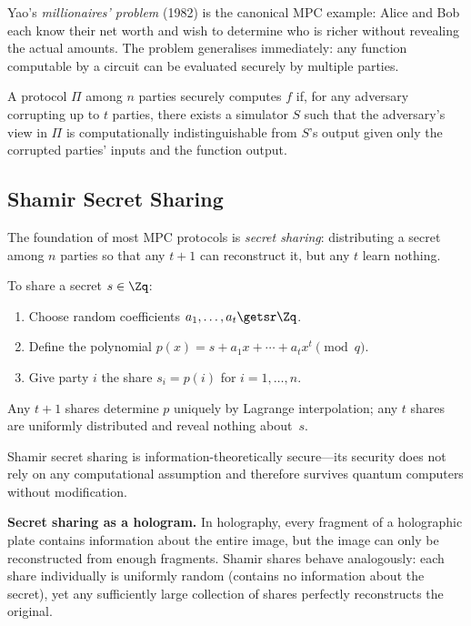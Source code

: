 Yao's \emph{millionaires' problem} (1982) is the canonical MPC example: Alice and Bob each know their net worth and wish to determine who is richer without revealing the actual amounts.  The problem generalises immediately: any function computable by a circuit can be evaluated securely by multiple parties.

\begin{definition}
\label{def:mpc}
A protocol $\Pi$ among $n$ parties securely computes $f$ if, for any adversary corrupting up to $t$ parties, there exists a simulator $S$ such that the adversary's view in $\Pi$ is computationally indistinguishable from $S$'s output given only the corrupted parties' inputs and the function output.
\end{definition}


\subsection{Shamir Secret Sharing}
\label{subsec:shamir}

The foundation of most MPC protocols is \emph{secret sharing}: distributing a secret among $n$ parties so that any $t+1$ can reconstruct it, but any $t$ learn nothing.

\begin{definition}
\label{def:shamir}
To share a secret $s \in \Zq$:
\begin{enumerate}
\item Choose random coefficients $a_1, \ldots, a_t \getsr \Zq$.
\item Define the polynomial $p(x) = s + a_1 x + \cdots + a_t x^t \pmod{q}$.
\item Give party $i$ the share $s_i = p(i)$ for $i = 1, \ldots, n$.
\end{enumerate}
Any $t+1$ shares determine $p$ uniquely by Lagrange interpolation; any $t$ shares are uniformly distributed and reveal nothing about~$s$.
\end{definition}

Shamir secret sharing is information-theoretically secure---its security does not rely on any computational assumption and therefore survives quantum computers without modification.

\begin{svgraybox}
\textbf{Secret sharing as a hologram.}
In holography, every fragment of a holographic plate contains information about the entire image, but the image can only be reconstructed from enough fragments.  Shamir shares behave analogously: each share individually is uniformly random (contains no information about the secret), yet any sufficiently large collection of shares perfectly reconstructs the original.
\end{svgraybox}


